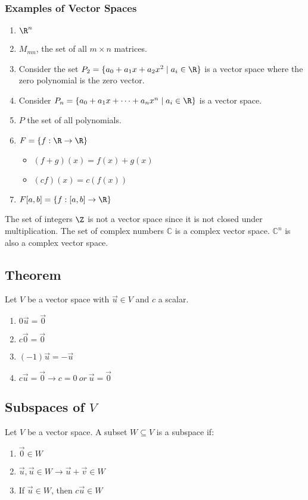 \documentclass{math}
\begin{document}
\subsubsection*{Examples of Vector Spaces}
\begin{enumerate}
  \item \( \R^n \)
  \item \( M_{mn} \), the set of all \( m\times n \) matrices.
  \item Consider the set \( P_2 = \{a_0+a_1x+a_2x^2\mid a_i\in\R\} \) is a
  vector space where the zero polynomial is the zero vector.
  \item Consider \( P_n = \{a_0+a_1x+\dots+a_nx^n\mid a_i\in\R\} \) is a
  vector space.
  \item \( P \) the set of all polynomials.
  \item \( F = \{f:\R\to\R\} \)
  \begin{itemize}
    \item \( (f+g)(x) = f(x)+g(x) \)
    \item \( (cf)(x) = c(f(x)) \)
  \end{itemize}
  \item \( F[a,b] = \{f:[a,b]\to\R\} \)
\end{enumerate}
The set of integers \( \Z \) is not a vector space since it is not closed under
multiplication. The set of complex numbers \( \mathbb{C} \) is a complex vector
space. \( \mathbb{C}^n \) is also a complex vector space.

\subsection*{Theorem}
Let \( V \) be a vector space with \( \vec{u}\in V \) and \( c \) a scalar.
\begin{enumerate}
  \item \( 0\vec{u} = \vec{0} \)
  \item \( c\vec{0} = \vec{0} \)
  \item \( (-1)\vec{u} = -\vec{u} \)
  \item \( c\vec{u} = \vec{0}\to c = 0~or~\vec{u}=\vec{0} \)
\end{enumerate}

\subsection*{Subspaces of \( V \)}
Let \( V \) be a vector space. A subset \( W\subseteq V \) is a subspace if:
\begin{enumerate}
  \item \( \vec{0}\in W \)
  \item \( \vec{u},\vec{u}\in W\to \vec{u}+\vec{v}\in W \)
  \item If \( \vec{u}\in W \), then \( c\vec{u}\in W \)
\end{enumerate}
\end{document}
